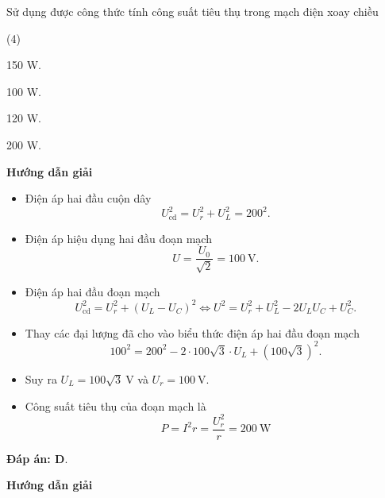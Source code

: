 \begin{dang}{Sử dụng được công thức tính công suất tiêu thụ trong mạch điện xoay chiều}
{		\begin{mcq} (4)
			\item 150 W.
			\item 100 W. 
			\item 120 W.
			\item 200 W.
		\end{mcq}
	}
	{	\begin{center}
			\textbf{Hướng dẫn giải}
		\end{center}
		
		\begin{itemize}
			\item Điện áp hai đầu cuộn dây 
			\begin{equation*}
				U^2_{\text{cd}}=U^2_r + U^2_L = 200^2.
			\end{equation*}
			\item Điện áp hiệu dụng hai đầu đoạn mạch 
			\begin{equation*}
				U=\dfrac{U_0}{\sqrt 2}=100\ \text{V}.
			\end{equation*}
			\item Điện áp hai đầu đoạn mạch
			\begin{equation*}
				U^2_{\text{cd}}=U^2_r + (U_L-U_C)^2 \Leftrightarrow U^2 =U^2_r + U^2_L - 2U_LU_C + U_C^2.
			\end{equation*}
			\item Thay các đại lượng đã cho vào biểu thức điện áp hai đầu đoạn mạch
			\begin{equation*}
				100^2 = 200^2  - 2 \cdot 100\sqrt 3 \cdot U_L + (100\sqrt 3)^2.	
			\end{equation*}
			\item Suy ra $U_L=100\sqrt 3\ \text{V}$ và $U_r= 100\ \text{V}$.
			\item Công suất tiêu thụ của đoạn mạch là 
			\begin{equation*}
				P=I^2r=\dfrac{U^2_r}{r} =200\ \text{W}
			\end{equation*}
		\end{itemize}
		
		\textbf{Đáp án: D}.
	}
	
	{	\begin{center}
			\textbf{Hướng dẫn giải}
		\end{center}
		
}
\end{dang}
